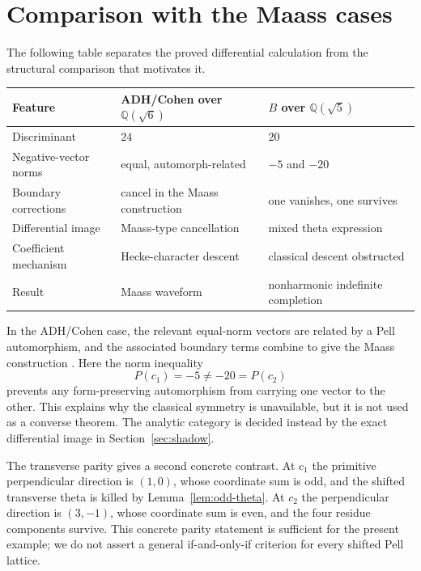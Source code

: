 \documentclass[12pt]{amsart}
\theoremstyle{definition}
\theoremstyle{remark}
\newcommand{\QQ}{\mathbb{Q}}
\begin{document}
\section{Comparison with the Maass cases}\label{sec:comparison}

The following table separates the proved differential calculation from the
structural comparison that motivates it.

\begin{center}
\small
\begin{tabular}{@{}lp{}p{}@{}}
\toprule
Feature & ADH/Cohen over $\QQ(\sqrt6)$ & $B$ over $\QQ(\sqrt5)$ \\
\midrule
Discriminant & $24$ & $20$ \\
Negative-vector norms & equal, automorph-related & $-5$ and $-20$ \\
Boundary corrections & cancel in the Maass construction & one vanishes, one survives \\
Differential image & Maass-type cancellation & mixed theta expression \\
Coefficient mechanism & Hecke-character descent & classical descent obstructed \\
Result & Maass waveform & nonharmonic indefinite completion \\
\bottomrule
\end{tabular}
\end{center}

In the ADH/Cohen case, the relevant equal-norm vectors are related by a
Pell automorphism, and the associated boundary terms combine to give
the Maass construction \cite{jADH88,jCo88,jZw12}.  Here the norm
inequality
\[
  P(c_1)=-5\neq-20=P(c_2)
\]
prevents any form-preserving automorphism from carrying one vector to
the other.  This explains why the classical symmetry is unavailable,
but it is not used as a converse theorem.  The analytic category is
decided instead by the exact differential image in
Section~\ref{sec:shadow}.

The transverse parity gives a second concrete contrast.  At $c_1$ the
primitive perpendicular direction is $(1,0)$, whose coordinate sum is
odd, and the shifted transverse theta is killed by
Lemma~\ref{lem:odd-theta}.  At $c_2$ the perpendicular direction is
$(3,-1)$, whose coordinate sum is even, and the four residue components
survive.  This concrete parity statement is sufficient for the present
example; we do not assert a general if-and-only-if criterion for every
shifted Pell lattice.
\end{document}
